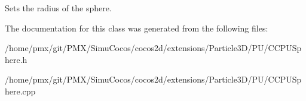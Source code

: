 Sets the radius of the sphere. 

The documentation for this class was generated from the following files\+:\begin{DoxyCompactItemize}
\item 
/home/pmx/git/\+P\+M\+X/\+Simu\+Cocos/cocos2d/extensions/\+Particle3\+D/\+P\+U/C\+C\+P\+U\+Sphere.\+h\item 
/home/pmx/git/\+P\+M\+X/\+Simu\+Cocos/cocos2d/extensions/\+Particle3\+D/\+P\+U/C\+C\+P\+U\+Sphere.\+cpp\end{DoxyCompactItemize}

